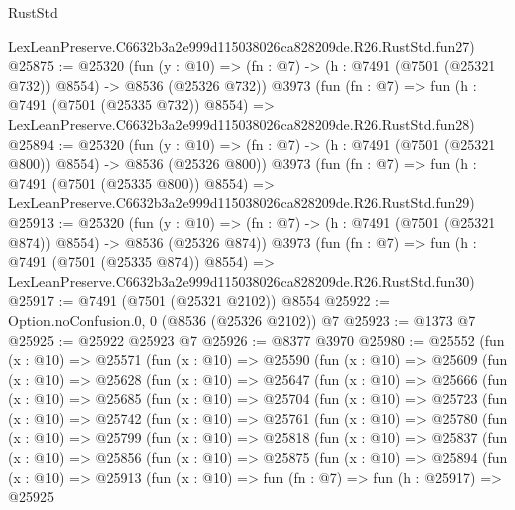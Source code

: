 \begin{lexlean}{RustStd}
\begin{coremodule}
    LexLeanPreserve.C6632b3a2e999d115038026ca828209de.R26.RustStd.fun27)
@25875 := @25320
    (fun (y : @10) => (fn : @7) -> (h : @7491 (@7501 (@25321 @732)) @8554) -> @8536 (@25326 @732))
    @3973
    (fun (fn : @7) =>
    fun (h : @7491 (@7501 (@25335 @732)) @8554) =>
    LexLeanPreserve.C6632b3a2e999d115038026ca828209de.R26.RustStd.fun28)
@25894 := @25320
    (fun (y : @10) => (fn : @7) -> (h : @7491 (@7501 (@25321 @800)) @8554) -> @8536 (@25326 @800))
    @3973
    (fun (fn : @7) =>
    fun (h : @7491 (@7501 (@25335 @800)) @8554) =>
    LexLeanPreserve.C6632b3a2e999d115038026ca828209de.R26.RustStd.fun29)
@25913 := @25320
    (fun (y : @10) => (fn : @7) -> (h : @7491 (@7501 (@25321 @874)) @8554) -> @8536 (@25326 @874))
    @3973
    (fun (fn : @7) =>
    fun (h : @7491 (@7501 (@25335 @874)) @8554) =>
    LexLeanPreserve.C6632b3a2e999d115038026ca828209de.R26.RustStd.fun30)
@25917 := @7491 (@7501 (@25321 @2102)) @8554
@25922 := Option.noConfusion.{0, 0} (@8536 (@25326 @2102)) @7
@25923 := @1373 @7
@25925 := @25922 @25923 @7
@25926 := @8377 @3970
@25980 := @25552
    (fun (x : @10) =>
    @25571
      (fun (x : @10) =>
      @25590
        (fun (x : @10) =>
        @25609
          (fun (x : @10) =>
          @25628
            (fun (x : @10) =>
            @25647
              (fun (x : @10) =>
              @25666
                (fun (x : @10) =>
                @25685
                  (fun (x : @10) =>
                  @25704
                    (fun (x : @10) =>
                    @25723
                      (fun (x : @10) =>
                      @25742
                        (fun (x : @10) =>
                        @25761
                          (fun (x : @10) =>
                          @25780
                            (fun (x : @10) =>
                            @25799
                              (fun (x : @10) =>
                              @25818
                                (fun (x : @10) =>
                                @25837
                                  (fun (x : @10) =>
                                  @25856
                                    (fun (x : @10) =>
                                    @25875
                                      (fun (x : @10) =>
                                      @25894
                                        (fun (x : @10) =>
                                        @25913
                                          (fun (x : @10) =>
                                          fun (fn : @7) =>
                                          fun (h : @25917) =>
                                          @25925

\end{coremodule}
\end{lexlean}

